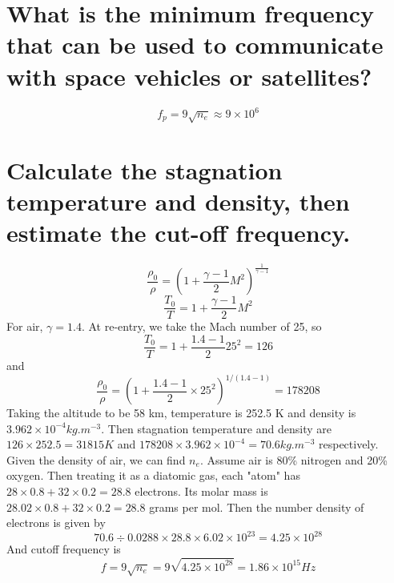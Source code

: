 \documentclass[answers]{exam}
\begin{document}
\begin{questions}
\question{}

\begin{parts}

\part{What is the minimum frequency that can be used to communicate with space vehicles or satellites?}

\begin{solution}
    $$f_p = 9\sqrt{n_e} \approx 9 \times 10^6$$
\end{solution}

\part{Calculate the stagnation temperature and density, then estimate the cut-off frequency.}

\begin{solution}
    $$\frac{\rho_0}{\rho} = \left(1 + \frac{\gamma-1}{2} M^2\right)^{\frac{1}{\gamma-1}}$$
    $$\frac{T_0}{T} = 1 + \frac{\gamma-1}{2} M^2$$
    For air, $\gamma = 1.4$. At re-entry, we take the Mach number of 25, so
    $$\frac{T_0}{T} = 1 + \frac{1.4-1}{2}25^2 = 126$$
    and
    $$\frac{\rho_0}{\rho} = \left(1 + \frac{1.4-1}{2} \times 25^2\right)^{1/(1.4-1)} = 178208$$
    Taking the altitude to be 58 km, temperature is 252.5 K and density is $3.962 \times 10^{-4}\unit{kg.m^{-3}}$. Then stagnation temperature and density are $126 \times 252.5 = 31815\unit{K}$ and $178208 \times 3.962 \times 10^{-4} = 70.6 \unit{kg.m^{-3}}$ respectively. \\
    Given the density of air, we can find $n_e$. Assume air is 80\% nitrogen and 20\% oxygen. Then treating it as a diatomic gas, each "atom" has $28 \times 0.8 + 32 \times 0.2 = 28.8$ electrons. Its molar mass is $28.02 \times 0.8 + 32 \times 0.2 = 28.8$ grams per mol. Then the number density of electrons is given by
    $$70.6 \div 0.0288 \times 28.8 \times 6.02 \times 10^{23} = 4.25 \times 10^{28}$$
    And cutoff frequency is
    $$f = 9\sqrt{n_e} = 9\sqrt{4.25 \times 10^{28}} = 1.86 \times 10^{15}\unit{Hz}$$
\end{solution}

\end{parts}




\end{questions}
\end{document}
